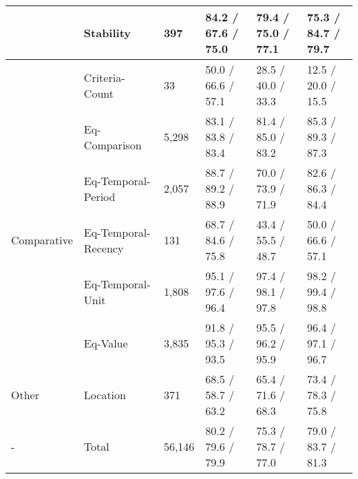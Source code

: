 \begin{tabular}{m{2cm} m{3.5cm} m{1.4cm} m{2.9cm} m{2.9cm} m{2.9cm}}
         & Stability & 397 & 84.2 / 67.6 / 75.0 & 79.4 / 75.0 / 77.1 & 75.3 / 84.7 / 79.7 \\
    \hline
      &
        Criteria-Count & 33 & 50.0 / 66.6 / 57.1 & 28.5 / 40.0 / 33.3 & 12.5 / 20.0 / 15.5 \\
     & Eq-Comparison & 5,298 & 83.1 / 83.8 / 83.4 & 81.4 / 85.0 / 83.2 & 85.3 / 89.3 / 87.3 \\
     & Eq-Temporal-Period & 2,057 & 88.7 / 89.2 / 88.9 & 70.0 / 73.9 / 71.9 & 82.6 / 86.3 / 84.4 \\
     Comparative & Eq-Temporal-Recency & 131 & 68.7 / 84.6 / 75.8 & 43.4 / 55.5 / 48.7 & 50.0 / 66.6 / 57.1 \\
     & Eq-Temporal-Unit & 1,808 & 95.1 / 97.6 / 96.4 & 97.4 / 98.1 / 97.8 & 98.2 / 99.4 / 98.8 \\
     & Eq-Value & 3,835 & 91.8 / 95.3 / 93.5 & 95.5 / 96.2 / 95.9 & 96.4 / 97.1 / 96.7  \\
    \hline   
    Other &
        Location & 371 & 68.5 / 58.7 / 63.2 & 65.4 / 71.6 / 68.3 & 73.4 / 78.3 / 75.8 \\
    \hline
    - & Total & 56,146 & 80.2 / 79.6 / 79.9 & 75.3 / 78.7 / 77.0 & 79.0 / 83.7 / 81.3 \\
    
\end{tabular}
